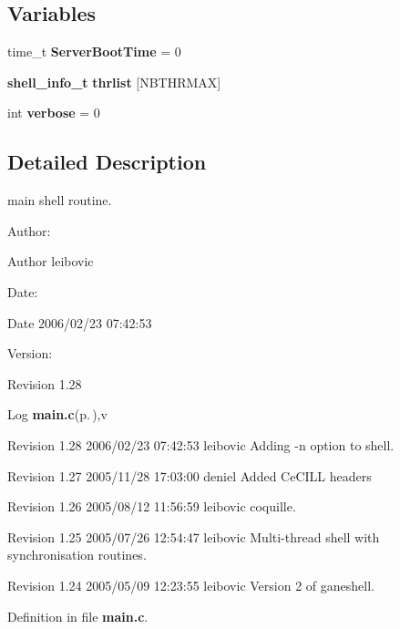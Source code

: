 \subsection*{Variables}
\begin{CompactItemize}
\item 
time\_\-t {\bf Server\-Boot\-Time} = 0
\item 
{\bf shell\_\-info\_\-t} {\bf thrlist} [NBTHRMAX]
\item 
int {\bf verbose} = 0
\end{CompactItemize}


\subsection{Detailed Description}
main shell routine. 

\begin{Desc}
\item[Author:]\begin{Desc}
\item[Author]leibovic \end{Desc}
\end{Desc}
\begin{Desc}
\item[Date:]\begin{Desc}
\item[Date]2006/02/23 07:42:53 \end{Desc}
\end{Desc}
\begin{Desc}
\item[Version:]\begin{Desc}
\item[Revision]1.28 \end{Desc}
\end{Desc}
\begin{Desc}
\item[Log]{\bf main.c}{\rm (p.\,\pageref{main_8c})},v \end{Desc}
Revision 1.28 2006/02/23 07:42:53 leibovic Adding -n option to shell.

Revision 1.27 2005/11/28 17:03:00 deniel Added Ce\-CILL headers

Revision 1.26 2005/08/12 11:56:59 leibovic coquille.

Revision 1.25 2005/07/26 12:54:47 leibovic Multi-thread shell with synchronisation routines.

Revision 1.24 2005/05/09 12:23:55 leibovic Version 2 of ganeshell.

Definition in file {\bf main.c}.

